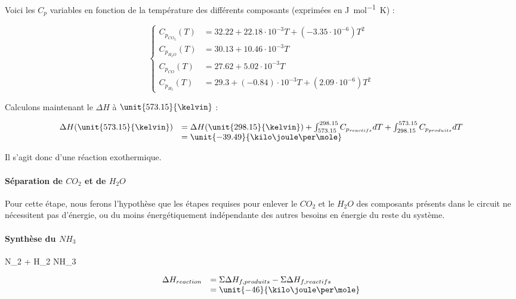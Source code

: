 Voici les $C_p$ variables en fonction de la température des différents composants\cite{hc-table}
(exprimées en \unit{\joule\per\mole\kelvin}) :

$$
	\left\{
		\begin{array}{rl}
			C_{p_{CO_{2}}}(T) &= 32.22 + 22.18\cdot10^{-3}T + (-3.35\cdot10^{-6})T^2\\
			C_{p_{H_2O}}(T)		&= 30.13 + 10.46\cdot10^{-3}T \\
			C_{p_{CO}}(T) 		&= 27.62 + 5.02\cdot10^{-3}T \\
			C_{p_{H_2}}(T) 		&= 29.3 + (-0.84)\cdot10^{-3}T + (2.09\cdot10^{-6})T^2
		\end{array}
	\right.
$$
					
Calculons maintenant le $\Delta H$ à $\unit{573.15}{\kelvin}$ :			

$$
	\begin{array}{rl}
		 	 \Delta H(\unit{573.15}{\kelvin})	&=  \Delta H(\unit{298.15}{\kelvin}) 
				+ \int_{573.15}^{298.15} C_{p_{reactifs}} dT + \int_{298.15}^{573.15} C_{p_{produits}} dT \\
				&=  \unit{-39.49}{\kilo\joule\per\mole}
	\end{array}
$$	
	
Il s'agit donc d'une réaction exothermique.

\paragraph{Séparation de $CO_{2}$ et de $H_{2}O$}		
Pour cette étape, nous ferons l'hypothèse que les étapes requises pour enlever le $CO_{2}$ et le $H_{2}O$ 
des composants présents dans le circuit ne nécessitent pas d'énergie, ou du moins énergétiquement indépendante 
des autres besoins en énergie du reste du système.

\paragraph{Synthèse du $NH_{3}$} 
\begin{chemmath}
		N_{2} + H_2 \Longrightarrow NH_3 
\end{chemmath}	

$$
	\begin{array}{rl}
	\Delta H_{reaction}		&= \Sigma \Delta H_{f,produits} - \Sigma \Delta H_{f,reactifs} \\
												&= \unit{-46}{\kilo\joule\per\mole}
	\end{array}
$$

